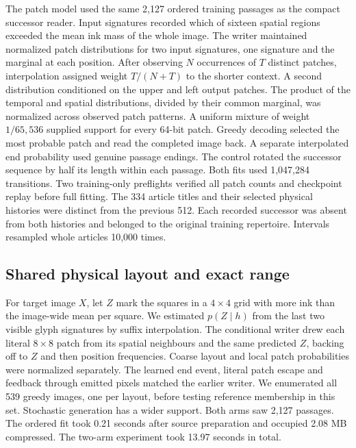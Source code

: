 \documentclass[12pt,a4paper]{article}
\providecommand{\DIFadd}[1]{{\protect\color{blue} \sf #1}} %
\begin{document}
\DIFadd{The patch model used the same 2,127 ordered training passages as the compact
successor reader. Input signatures recorded which of sixteen spatial
regions exceeded the mean ink mass of the whole image. The writer maintained
normalized patch distributions for two input signatures, one signature and
the marginal at each position. After observing $N$ occurrences of $T$ distinct
patches, interpolation assigned weight $T/(N+T)$ to the shorter context.
A second distribution conditioned on the upper and left output patches.
The product of the temporal and spatial distributions, divided by their
common marginal, was normalized across observed patch patterns. A uniform
mixture of weight $1/65{,}536$ supplied support for every 64-bit patch.
Greedy decoding selected the most probable patch and read the completed
image back. A separate interpolated end probability used genuine passage
endings. The control rotated the successor sequence by half its length
within each passage. Both fits used 1,047,284 transitions. Two training-only
preflights verified all patch counts and checkpoint replay before full fitting.
The 334 article titles and their selected physical histories were distinct
from the previous 512. Each recorded successor was absent from both histories
and belonged to the original training repertoire. Intervals resampled whole
articles 10,000 times.
}

\subsection*{\DIFadd{Shared physical layout and exact range}}
\DIFadd{For target image $X$, let $Z$ mark the squares in a $4\times4$ grid with more
ink than the image-wide mean per square. We estimated $p(Z\mid h)$ from the
last two visible glyph signatures by suffix interpolation. The conditional
writer drew each literal $8\times8$ patch from its spatial neighbours and
the same predicted $Z$, backing off to $Z$ and then position frequencies.
Coarse layout and local patch probabilities were normalized separately.
The learned end event, literal patch escape and feedback through emitted
pixels matched the earlier writer. We enumerated all 539 greedy images,
one per layout, before testing reference membership in this set.
Stochastic generation has a wider support. Both arms saw 2,127 passages.
The ordered fit took 0.21 seconds after source preparation and occupied
2.08 MB compressed. The two-arm experiment took 13.97 seconds in total.
}
\end{document}
